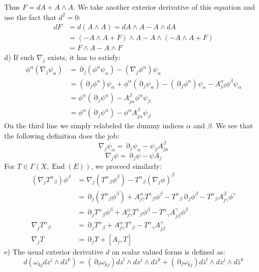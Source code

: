 \documentclass[12 pt]{article}
\DeclareMathOperator {\p} {\partial}
\DeclareMathOperator {\End}{End}
\theoremstyle{plain}
\theoremstyle{definition}
\theoremstyle{remark}
\begin{document}
Thus $ F = dA + A \wedge A$. We take another exterior derivative of this equation and use the fact that $d^2 =0$:
\begin{align*}
     dF &= d(A \wedge A) = dA \wedge A - A \wedge dA     \\
&= ( - A \wedge A + F) \wedge A - A \wedge (- A \wedge A + F) \\
&= F \wedge A - A \wedge F
\end{align*}
d) If such $\nabla_j$ exists, it has to satisfy:
\begin{align*}
        \phi^{\alpha} (\nabla_j \psi_{\alpha}) &= \p_j(\phi^{\alpha} \psi_{\alpha}) - (\nabla_j \phi^{\alpha}) \psi_{\alpha}        \\    
& = (\p_j \phi^{\alpha}) \psi_{\alpha} + \phi^{\alpha} (\p_j \psi_{\alpha}) - (\p_j \phi^{\alpha}) \psi_{\alpha} - A^{\alpha}_{j \beta} \phi^{\beta} \psi_{\alpha}  \\
& = \phi^{\alpha} (\p_j \psi^{\alpha}) - A^{\beta}_{j \alpha} \phi^{\alpha} \psi_{\beta} \\
&= \phi^{\alpha} (\p_j \psi^{\alpha}) - \phi^{\alpha} A^{\beta}_{j \alpha} \psi_{\beta}
\end{align*}
On the third line we simply relabeled the dummy indices $\alpha$ and $\beta$. We see that the following definition does the job:
\[      \nabla_j \psi_{\alpha} = \p_j \psi_{\alpha} -  \psi_{\beta} A^{\beta}_{j \alpha} \]
\[      \nabla_j \psi = \p_j \psi - \psi A_j      \]
For $T \in \Gamma(X, \End(E))$, we proceed similarly:
\begin{align*}
(\nabla_j {T^{\alpha}}_{\beta}) \phi^{\beta} &= \nabla_j ({T^{\alpha}}_{\beta} \phi^{\beta}) - {T^{\alpha}}_{\beta} (\nabla_j \phi)^{\beta} \\
&= \p_j ({T^{\alpha}}_{\beta} \phi^{\beta} ) + A^{\alpha}_{j \gamma} {T^{\gamma}}_{\beta} \phi^{\beta} - {T^{\alpha}}_{\beta} \p_j \phi^{\beta} - {T^{\alpha}}_{\beta} A^{\beta}_{j \gamma} \phi^{\gamma} \\
&= \p_j {T^{\alpha}}_{\beta} \phi^{\beta} + A^{\alpha}_{j \gamma} {T^{\gamma}}_{\beta} \phi^{\beta} - {T^{\alpha}}_{\gamma} A^{\gamma}_{j \beta} \phi^{\beta}  \\
\nabla_j {T^{\alpha}}_{\beta} &= \p_j {T^{\alpha}}_{\beta} + A^{\alpha}_{j \gamma} {T^{\gamma}}_{\beta} - {T^{\alpha}}_{\gamma} A^{\gamma}_{j \beta} \\
\nabla_j T &= \p_j T + [A_j, T]
\end{align*}
e) The usual exterior derivative $d$ on scalar valued forms is defined as:
\[       d (\omega_{\bar k j} dz^j \wedge d \bar z^k ) =  (\p_l \omega_{\bar k j}) dz^l \wedge dz^j \wedge d \bar z^k  + (\p_{\bar l} \omega_{\bar k j}) d\bar z^l \wedge dz^j \wedge d \bar z^k  \]    
\end{document}

